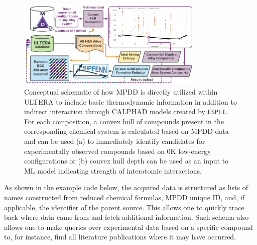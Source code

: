 \begin{figure}[H]
    \centering
    \includegraphics[width=0.8\textwidth]{ultera/ULTERA_BasicThermodynamics_V1.png}
    \caption{Conceptual schematic of how MPDD is directly utilized within ULTERA to include basic thermodynamic information in addition to indirect interaction through CALPHAD models created by \texttt{ESPEI}. For each composition, a convex hull of compounds present in the corresponding chemical system is calculated based on MPDD data and can be used (a) to immediately identify candidates for experimentally observed compounds based on 0K low-energy configurations or (b) convex hull depth can be used as an input to ML model indicating strength of interatomic interactions.}
    \label{ultera:fig:mpdd}
\end{figure}

As shown in the example code below, the acquired data is structured as lists of names constructed from reduced chemical formulas, MPDD unique ID, and, if applicable, the identifier of the parent source. This allows one to quickly trace back where data came from and fetch additional information. Such schema also allows one to make queries over experimental data based on a specific compound to, for instance, find all literature publications where it may have occurred.


